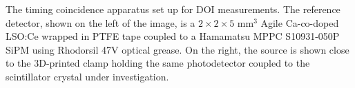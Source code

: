 \label{fig:actualsetup} The timing coincidence apparatus set up for DOI measurements. The reference detector, shown on the left of the image, is a $2\times2\times5$ mm$^3$ Agile Ca-co-doped LSO:Ce wrapped in PTFE tape coupled to a Hamamatsu MPPC S10931-050P SiPM using Rhodorsil 47V optical grease. On the right, the source is shown close to the 3D-printed clamp holding the same photodetector coupled to the scintillator crystal under investigation.